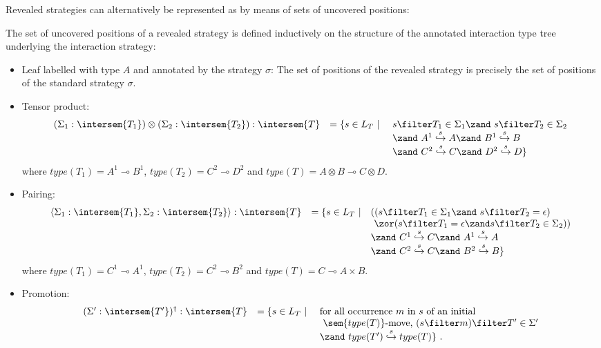 Revealed strategies can alternatively be represented as by means
of sets of uncovered positions:
\begin{definition}
\label{dfn:revealedstrat}
The set of uncovered positions of a revealed strategy is defined inductively on the
structure of the annotated interaction type tree underlying the
interaction strategy:
\begin{itemize}[-]
\item Leaf labelled with type $A$ and annotated by the strategy $\sigma$: The set of positions of the revealed strategy is precisely the set of positions of the standard strategy $\sigma$.


\item Tensor product: $$\begin{array}{lcll}
(\Sigma_1 : \intersem{T_1}) \otimes (\Sigma_2 : \intersem{T_2}) : \intersem{T} &=\{ s \in L_T \ | \  &s \filter T_1 \in \Sigma_1 \zand\ s \filter T_2 \in \Sigma_2 \\
&& \zand\ A^1\stackrel{s}\hookrightarrow A  \zand\ B^1\stackrel{s}\hookrightarrow B \\
&& \zand\ C^2\stackrel{s}\hookrightarrow C  \zand\ D^2\stackrel{s}\hookrightarrow D \}
\end{array}$$
where $type(T_1) = A^1\multimap B^1$,
$type(T_2) = C^2\multimap D^2$
and $type(T) = A\otimes B \multimap C \otimes D$.
 
\item Pairing: $$\begin{array}{lcll}
\langle \Sigma_1 : \intersem{T_1}, \Sigma_2 : \intersem{T_2} \rangle : \intersem{T} &= \{ s \in L_T \ | &
   ( (s \filter T_1 \in \Sigma_1 \zand\ s \filter T_2 = \epsilon) \\
&&  \   \zor ( s \filter T_1 = \epsilon \zand s \filter T_2 \in \Sigma_2)) \\
&& \zand\ C^1\stackrel{s}\hookrightarrow C \zand\ A^1\stackrel{s}\hookrightarrow A  \\
&& \zand\ C^2\stackrel{s}\hookrightarrow C \zand\ B^2\stackrel{s}\hookrightarrow B  \}
\end{array}$$
where $type(T_1) = C^1\multimap A^1$,
$type(T_2) = C^2\multimap B^2$
and $type(T) = C\multimap A \times B$.

\item Promotion: $$\begin{array}{lcll}
(\Sigma' : \intersem{T'})^\dagger : \intersem{T} &= \{ s \in L_T \ | \ &
\mbox {for all occurrence $m$ in $s$ of an initial  }\\
&& \mbox{ $\sem{type(T)}$-move, $(s \filter m) \filter T' \in \Sigma'$} \\
&& \zand\ type(T')\stackrel{s}\hookrightarrow type(T) \} \ .
\end{array}$$


\end{itemize}
\end{definition}
